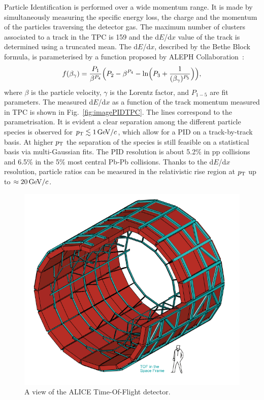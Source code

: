Particle Identification is performed over a wide momentum range. It is made by 
simultaneously measuring the specific energy loss, the charge and the momentum of the 
particles traversing the detector gas. The maximum number of clusters associated to a track in the TPC 
is 159 and the d$E$/d$x$ value of the track is determined using a truncated mean.
The d$E$/d$x$, described by the Bethe Block formula,
is parameterised by a function proposed by ALEPH Collaboration~\cite{Rolandi:2008qla}:
\begin{equation}
f(\beta_\gamma) = \frac{P_1}{\beta^{P_4}} \Big ( P_2 - \beta^{P_4} - {\rm ln}\Big (   P_3 + \frac{1}{(\beta_\gamma)^{P_5}} \Big )   \Big ),
\end{equation}
where $\beta$ is the particle velocity, $\gamma$ is the Lorentz factor, and $P_{1-5}$ are fit parameters. 
The measured d$E$/d$x$ as a function of the track momentum measured in TPC is
shown in Fig.~\ref{fig:imagePIDTPC}. The lines correspond to the parametrisation. 
It is evident a clear separation among the different particle species
is observed for $p_{\rm T} \lesssim 1 \, \mathrm{GeV}/c$, which allow for a PID on a track-by-track basis. At higher $p_{\rm T}$ the separation of the species is still feasible 
on a statistical basis via multi-Gaussian fits. The PID resolution is about 5.2\% in 
pp collisions and 6.5\% in the 5\% most central Pb-Pb collisions. Thanks to the d$E$/d$x$ resolution, 
particle ratios can be measured in the relativistic rise region at $p_{\rm T}$ up to $\approx 20\, \mathrm{GeV}/c$.
 \begin{figure}[!h]
\centering
\includegraphics[width=.5\textwidth]{FigCap3/TOFCylinder.png}
\caption{A view of the ALICE Time-Of-Flight detector.}
\label{fig:imageTOF}
\end{figure}
